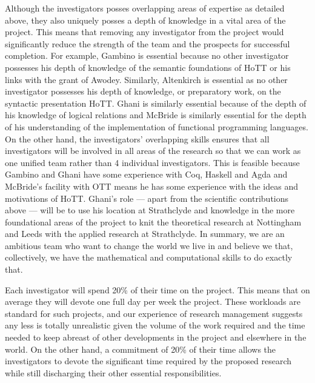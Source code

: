 \documentclass[a4paper,11pt]{article}
\begin{document}
\noindent Although the investigators posses overlapping areas of expertise as
detailed above, they also uniquely posses a depth of knowledge
in a vital area of the project. This means that removing any
investigator from the project would significantly reduce the strength
of the team and the prospects for successful completion. For example,
Gambino is essential because no other investigator possesses his depth
of knowledge of the semantic foundations of HoTT or his links with the
grant of Awodey. Similarly, Altenkirch is essential as no other
investigator possesses his depth of knowledge, or preparatory work, on
the syntactic presentation HoTT. Ghani is similarly essential because
of the depth of his knowledge of logical relations and McBride is
similarly essential for the depth of his understanding of the
implementation of functional programming languages. On the other hand,
the investigators' overlapping skills ensures that all investigators
will be involved in all areas of the research so that we can work
as one unified team rather than 4 individual investigators. This is
feasible because Gambino and Ghani have some experience with
Coq, Haskell and Agda and McBride's facility with OTT means he has some experience with
the ideas and motivations of HoTT. Ghani's role --- apart from the
scientific contributions above --- will be to use his location at
Strathclyde and knowledge in the more foundational areas of the
project to knit the theoretical research at Nottingham and Leeds with
the applied research at Strathclyde. In summary, we are an ambitious
team who want to change the world we live in and believe we that,
collectively, we have the mathematical and computational skills to do
exactly that.





\vspace{0.02in}

Each investigator will spend 20\% of their time on the project.  This
means that on average they will devote one full day per week the
project. These workloads are standard for such projects, and our
experience of research management suggests any less is totally
unrealistic given the volume of the work required and the time needed
to keep abreast of other developments in the project and elsewhere in
the world.  On the other hand, a commitment of 20\% of their time
allows the investigators to devote the significant time required by
the proposed research while still discharging their other essential
responsibilities.
\end{document}
